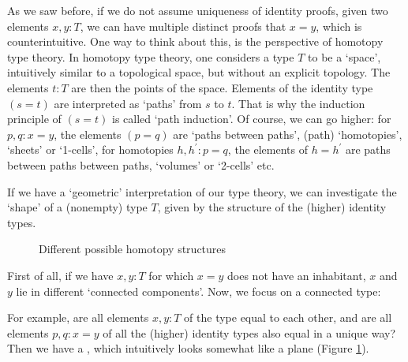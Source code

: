As we saw before, if we do not assume uniqueness of identity proofs, given two elements $ x, y: T $, we can have multiple distinct proofs that $ x = y $, which is counterintuitive. One way to think about this, is the perspective of homotopy type theory. In homotopy type theory, one considers a type $ T $ to be a `space', intuitively similar to a topological space, but without an explicit topology. The elements $ t : T $ are then the points of the space. Elements of the identity type $ (s = t) $ are interpreted as `paths' from $ s $ to $ t $. That is why the induction principle of $ (s = t) $ is called `path induction'. Of course, we can go higher: for $ p, q : x = y $, the elements $ (p = q) $ are `paths between paths', (path) `homotopies', `sheets' or `1-cells', for homotopies $ h, h^\prime: p = q $, the elements of $ h = h^\prime $ are paths between paths between paths, `volumes' or `2-cells' etc.

If we have a `geometric' interpretation of our type theory, we can investigate the `shape' of a (nonempty) type $ T $, given by the structure of the (higher) identity types.

\begin{figure}
  \begin{subfigure}{.3\textwidth}
    
    \caption{}
    \label{fig:homotopy-plane}
  \end{subfigure}
  \begin{subfigure}{.3\textwidth}
    
    \caption{}
    \label{fig:homotopy-cylinder}
  \end{subfigure}
  \begin{subfigure}{.3\textwidth}
    
    \caption{}
    \label{fig:homotopy-sphere}
  \end{subfigure}
  \caption{Different possible homotopy structures}
\end{figure}

First of all, if we have $ x, y : T $ for which $ x = y $ does not have an inhabitant, $ x $ and $ y $ lie in different `connected components'. Now, we focus on a connected type:

For example, are all elements $ x, y: T $ of the type equal to each other, and are all elements $ p, q: x = y $ of all the (higher) identity types also equal in a unique way? Then we have a , which intuitively looks somewhat like a plane (Figure \ref{fig:homotopy-plane}).

